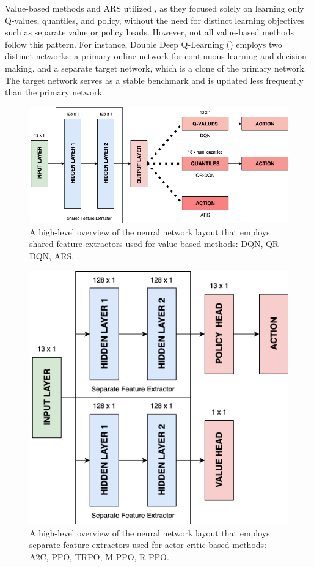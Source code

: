 \bigskip

\noindent Value-based methods and ARS utilized , as they focused solely on learning only Q-values, quantiles, and policy, without the need for distinct learning objectives such as separate value or policy heads. However, not all value-based methods follow this pattern. For instance, Double Deep Q-Learning (\textcolor{deepblue}{\cite{vanhasselt2015deep}}) employs two distinct networks: a primary online network for continuous learning and decision-making, and a separate target network, which is a clone of the primary network. The target network serves as a stable benchmark and is updated less frequently than the primary network.

\begin{figure}[htbp]
    \centering
    \includegraphics[width=0.8\linewidth]{images/methods_singleunit/net/shared_policy.png}
    \captionsetup{justification=justified, singlelinecheck=false, width=1\linewidth, labelfont=bf} 
    \caption[]{A high-level overview of the neural network layout that employs shared feature extractors used for value-based methods: DQN, QR-DQN, ARS. \protect\footnotemark.}
    \label{fig:shared-policy}
\end{figure}

\begin{figure}[htbp]
    \centering
    \includegraphics[width=0.5\linewidth]{images/methods_singleunit/net/separate_policy.png}
    \captionsetup{justification=justified, singlelinecheck=false, width=1\linewidth, labelfont=bf} 
    \caption[]{A high-level overview of the neural network layout that employs separate feature extractors used for actor-critic-based methods: A2C, PPO, TRPO, M-PPO, R-PPO. \protect\footnotemark.}
    \label{fig:separate-policy}
\end{figure}

